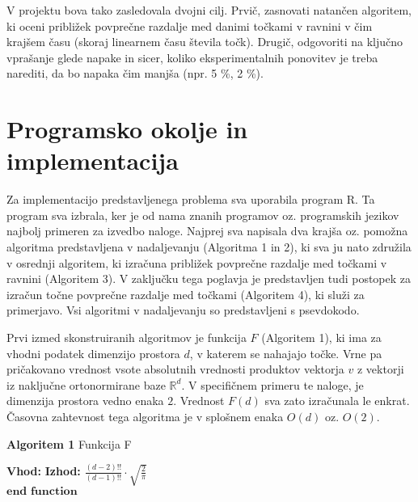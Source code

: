 \documentclass[12pt,a4paper]{amsart}
\theoremstyle{definition} %
\theoremstyle{plain} %
\begin{document}
V projektu bova tako zasledovala dvojni cilj. Prvič, zasnovati natančen algoritem, ki oceni približek povprečne razdalje med danimi točkami v ravnini v čim krajšem času (skoraj linearnem času števila točk). Drugič, odgovoriti na ključno vprašanje glede napake in sicer, koliko eksperimentalnih ponovitev je treba narediti, da bo napaka čim manjša (npr. 5 \%, 2 \%).

\section{Programsko okolje in implementacija}

Za implementacijo predstavljenega problema sva uporabila program R. Ta program sva izbrala, ker je od nama znanih programov oz. programskih jezikov najbolj primeren za izvedbo naloge. Najprej sva napisala dva krajša oz. pomožna algoritma predstavljena v nadaljevanju (Algoritma 1 in 2), ki sva ju nato združila v osrednji algoritem, ki izračuna približek povprečne razdalje med točkami v ravnini (Algoritem 3). V zaključku tega poglavja je predstavljen tudi postopek za izračun točne povprečne razdalje med točkami (Algoritem 4), ki služi za primerjavo. Vsi algoritmi v nadaljevanju so predstavljeni s psevdokodo.

Prvi izmed skonstruiranih algoritmov je funkcija $F$ (Algoritem 1), ki ima za vhodni podatek dimenzijo prostora $d$, v katerem se nahajajo točke. Vrne pa pričakovano vrednost vsote absolutnih vrednosti produktov vektorja $v$ z vektorji iz naključne ortonormirane baze $\mathbb{R}^d$. V specifičnem primeru te naloge, je dimenzija prostora vedno enaka $2$. Vrednost $F(d)$ sva zato izračunala le enkrat. Časovna zahtevnost tega algoritma je v splošnem enaka $O(d)$ oz. $O(2)$.  

\let\oldnl\nl
\newcommand{\nonl}{\renewcommand{\nl}{\let\nl\oldnl}}

\begin{algorithm}[H]
\caption{\textbf{Algoritem 1} Funkcija F}\label{f}
\begin{algorithmic}[1]
\Statex \textbf{Vhod:}  
\Statex \textbf{Izhod:}  
  \hspace{13mm} 
\State  $ \frac{(d-2)!!}{(d-1)!!} \cdot \sqrt{\frac{2}{\pi}} $ \\
$\textbf{end function}$
\EndFunction
\end{algorithmic}
\end{algorithm}
\end{document}
